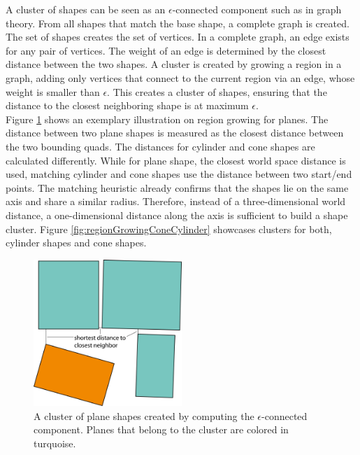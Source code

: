 A cluster of shapes can be seen as an $\epsilon$-connected component such as in graph theory. From all shapes that match the base shape, a complete graph is created. The set of shapes creates the set of vertices. In a complete graph, an edge exists for any pair of vertices. The weight of an edge is determined by the closest distance between the two shapes. A cluster is created by growing a region in a graph, adding only vertices that connect to the current region via an edge, whose weight is smaller than $\epsilon$. This creates a cluster of shapes, ensuring that the distance to the closest neighboring shape is at maximum $\epsilon$. 
\\
Figure \ref{fig:regionGrowingPlanes} shows an exemplary illustration on region growing for planes. The distance between two plane shapes is measured as the closest distance between the two bounding quads. The distances for cylinder and cone shapes are calculated differently. While for plane shape, the closest world space distance is used, matching cylinder and cone shapes use the distance between two start/end points. The matching heuristic already confirms that the shapes lie on the same axis and share a similar radius. Therefore, instead of a three-dimensional world distance, a one-dimensional distance along the axis is sufficient to build a shape cluster. Figure \ref{fig:regionGrowingConeCylinder} showcases clusters for both, cylinder shapes and cone shapes. 

\begin{figure}
	\centering
	\includegraphics[width=0.5\textwidth]{Shape_Detection/regionGrowingPlanes.png}
	\caption{A cluster of plane shapes created by computing the $\epsilon$-connected component. Planes that belong to the cluster are colored in turquoise.}
	\label{fig:regionGrowingPlanes}
\end{figure}


